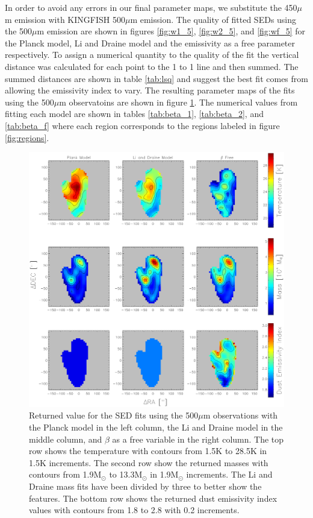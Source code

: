 In order to avoid any errors in our final parameter maps, we substitute the 450$\mu$m emission with KINGFISH 500$\mu$m emission.  The quality of fitted SEDs using the 500$\mu$m emission are shown in figures \ref{fig:w1_5}, \ref{fig:w2_5}, and \ref{fig:wf_5} for the Planck model, Li and Draine model and the emissivity as a free parameter respectively.  To assign a numerical quantity to the quality of the fit the vertical distance was calculated for each point to the 1 to 1 line and then summed.  The summed distances are shown in table \ref{tab:lsq} and suggest the best fit comes from allowing the emissivity index to vary.  The resulting parameter maps of the fits using the 500$\mu$m observatoins are shown in figure \ref{fig:param_fits}. The numerical values from fitting each model are shown in tables \ref{tab:beta_1}, \ref{tab:beta_2}, and \ref{tab:beta_f} where each region corresponds to the regions labeled in figure \ref{fig:regions}.

\begin{figure}
  \centering
  \includegraphics[width=1.\textwidth]{sed_imgs/parameter_full.eps}
  \caption[SED Parameter Maps]{Returned value for the SED fits using the 500$\mu$m observations with the Planck model in the left column, the Li and Draine model in the middle column, and $\beta$ as a free variable in the right column.  The top row shows the temperature with contours from 1.5K to 28.5K in 1.5K increments.  The second row show the returned masses with contours from 1.9M$_\odot$ to 13.3M$_\odot$ in 1.9M$_\odot$ increments.  The Li and Draine mass fits have been divided by three to better show the features.  The bottom row shows the returned dust emissivity index values with contours from 1.8 to 2.8 with 0.2 increments.}
  \label{fig:param_fits}
\end{figure}

